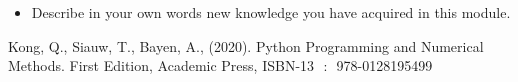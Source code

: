 \takehome

\begin{itemize}
\item Describe in your own words new knowledge you have acquired in this module.
\end{itemize}
%
\begin{refenumerate}
\item Kong, Q., Siauw, T., Bayen, A., (2020). Python Programming and Numerical Methods. First Edition, Academic Press,  ISBN-13 ‏ : ‎ 978-0128195499 \\
\end{refenumerate}